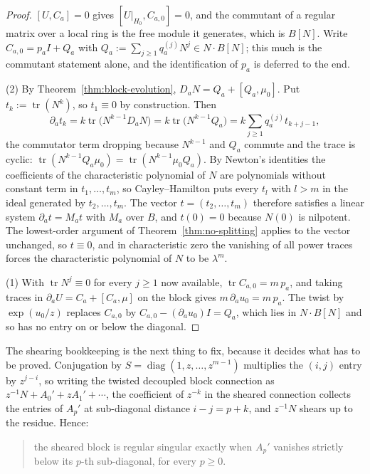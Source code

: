 \documentclass[11pt]{article}
\theoremstyle{definition}
\theoremstyle{remark}
\begin{document}
\begin{proof}
$[U,C_a]=0$ gives $[U|_{H_0},C_{a,0}]=0$, and the commutant of a regular matrix
over a local ring is the free module it generates, which is $B[N]$. Write
$C_{a,0}=p_aI+Q_a$ with $Q_a:=\sum_{j\ge1}q_a^{(j)}N^j\in N\cdot B[N]$; this much
is the commutant statement alone, and the identification of $p_a$ is deferred to
the end.

(2) By Theorem~\ref{thm:block-evolution},
$D_aN=Q_a+[Q_a,\mu_0]$. Put $t_k:=\operatorname{tr}(N^k)$, so $t_1\equiv0$ by
construction. Then
\[
  \partial_at_k=k\operatorname{tr}\bigl(N^{k-1}D_aN\bigr)
  =k\operatorname{tr}\bigl(N^{k-1}Q_a\bigr)
  =k\sum_{j\ge1}q_a^{(j)}t_{k+j-1},
\]
the commutator term dropping because $N^{k-1}$ and $Q_a$ commute and the trace
is cyclic:
$\operatorname{tr}(N^{k-1}Q_a\mu_0)=\operatorname{tr}(N^{k-1}\mu_0Q_a)$. By
Newton's identities the coefficients of the characteristic polynomial of $N$ are
polynomials without constant term in $t_1,\dots,t_m$, so Cayley--Hamilton puts
every $t_l$ with $l>m$ in the ideal generated by $t_2,\dots,t_m$. The vector
$t=(t_2,\dots,t_m)$ therefore satisfies a linear system $\partial_at=M_at$ with
$M_a$ over $B$, and $t(0)=0$ because $N(0)$ is nilpotent. The lowest-order
argument of Theorem~\ref{thm:no-splitting} applies to the vector unchanged, so
$t\equiv0$, and in characteristic zero the vanishing of all power traces forces
the characteristic polynomial of $N$ to be $\lambda^m$.

(1) With $\operatorname{tr}N^j\equiv0$ for every $j\ge1$ now available,
$\operatorname{tr}C_{a,0}=m\,p_a$, and taking traces in
$\partial_aU=C_a+[C_a,\mu]$ on the block gives $m\,\partial_au_0=m\,p_a$. The
twist by $\exp(u_0/z)$ replaces $C_{a,0}$ by $C_{a,0}-(\partial_au_0)I=Q_a$,
which lies in $N\cdot B[N]$ and so has no entry on or below the diagonal.
\end{proof}

The shearing bookkeeping is the next thing to fix, because it decides what has
to be proved. Conjugation by $S=\operatorname{diag}(1,z,\dots,z^{m-1})$
multiplies the $(i,j)$ entry by $z^{j-i}$, so writing the twisted decoupled
block connection as $z^{-1}N+A_0'+zA_1'+\cdots$, the coefficient of $z^{-k}$ in
the sheared connection collects the entries of $A_p'$ at sub-diagonal distance
$i-j=p+k$, and $z^{-1}N$ shears up to the residue. Hence:

\begin{quote}
the sheared block is regular singular exactly when $A_p'$ vanishes strictly
below its $p$-th sub-diagonal, for every $p\ge0$.
\end{quote}
\end{document}
